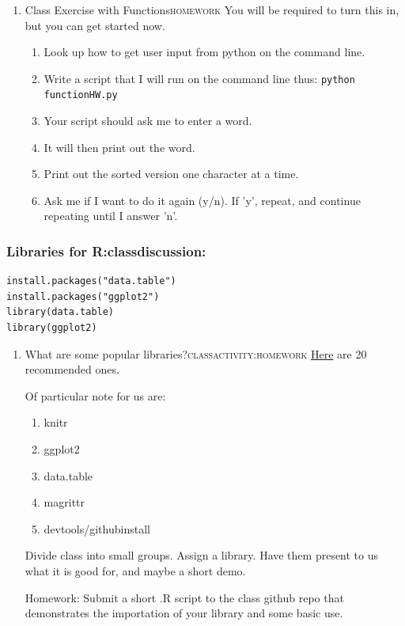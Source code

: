 \documentclass{article}
\begin{document}
\begin{enumerate}
\item Class Exercise with Functions\hfill{}\textsc{homework}
\label{sec:org646679c}
You will be required to turn this in, but you can get started now. 
\begin{enumerate}
\item Look up how to get user input from python on the command line.
\item Write a script that I will run on the command line thus:
\texttt{python functionHW.py}
\item Your script should ask me to enter a word.
\item It will then print out the word.
\item Print out the sorted version one character at a time.
\item Ask me if I want to do it again (y/n). If 'y', repeat, and continue repeating until I answer 'n'.
\end{enumerate}
\end{enumerate}
\subsubsection{Libraries for R:classdiscussion:}
\label{sec:orgff4bccb}
\begin{verbatim}
install.packages("data.table")
install.packages("ggplot2")
library(data.table)
library(ggplot2)
\end{verbatim}
\begin{enumerate}
\item What are some popular libraries?\hfill{}\textsc{classactivity:homework}
\label{sec:org592f717}
\href{https://pythontips.com/2013/07/30/20-python-libraries-you-cant-live-without/}{Here} are 20 recommended ones.

Of particular note for us are:
\begin{enumerate}
\item knitr
\item ggplot2
\item data.table
\item magrittr
\item devtools/githubinstall
\end{enumerate}

Divide class into small groups. Assign a library. Have them present to us what it is good for, and maybe a short demo. 

Homework: Submit a short .R script to the class github repo that demonstrates the importation of your library and some basic use.
\end{enumerate}
\end{document}
